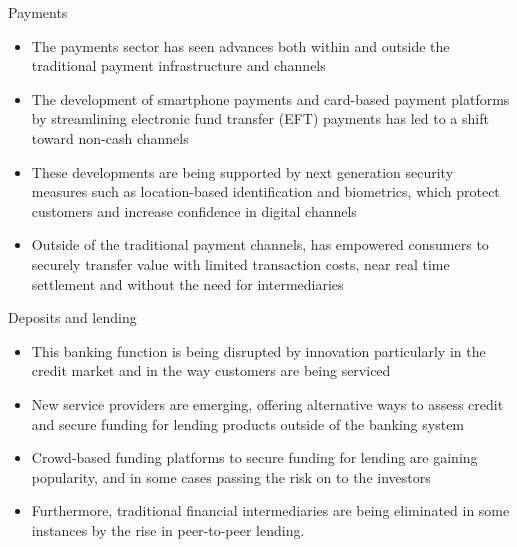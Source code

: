 \documentclass[11pt]{beamer}
\begin{document}
\begin{frame}{Payments}
	\begin{itemize}
		\item The payments sector has seen advances both within and outside the traditional payment infrastructure and channels
		\item The development of smartphone payments and card-based payment platforms by streamlining electronic fund transfer (EFT) payments has led to a shift toward non-cash channels
		\item These developments are being supported by next generation security measures such as location-based identification and biometrics, which protect customers and increase confidence in digital channels
		\item Outside of the traditional payment channels, has empowered consumers to securely transfer value with limited transaction costs, near real time settlement and without the need for intermediaries
	\end{itemize}
\end{frame}


\begin{frame}{Deposits and lending}
	\begin{itemize}
		\item This banking function is being disrupted by innovation particularly in the credit market and in the way customers are being serviced
		\item New service providers are emerging, offering alternative ways to assess credit and secure funding for lending products outside of the banking system
		\item Crowd-based funding platforms to secure funding for lending are gaining popularity, and in some cases passing the risk on to the investors
		\item Furthermore, traditional financial intermediaries are being eliminated in some instances by the rise in peer-to-peer lending.
	\end{itemize}
\end{frame}

\end{document}
